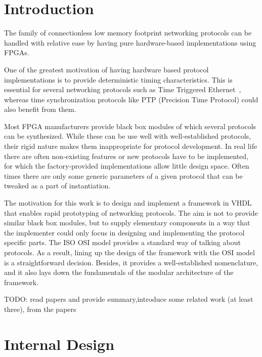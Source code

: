 \documentclass[conference]{IEEEtran}
\begin{document}

\section{Introduction}\label{sec:Motivation}

The family of connectionless low memory footprint networking protocols can be handled with relative ease by having pure
hardware-based implementations using FPGAs.

One of the greatest motivation of having hardware based protocol implementations is to provide deterministic timing
characteristics. This is essential for several networking protocols such as Time Triggered Ethernet~\cite{SAE_AS6802},
whereas time synchronization protocols like PTP (Precision Time Protocol) \cite{PTP_standard}could also benefit from
them.

Most FPGA manufacturers provide black box modules of which several protocols can be synthesized. While these can be use
well with well-established protocols, their rigid nature makes them inappropriate for protocol development. In real
life there are often non-existing features
or new protocols have to be implemented, for which the factory-provided implementations allow little design space.
Often times there are only some generic parameters of a given protocol that can be tweaked as a part of instantiation.

The motivation for this work is to design and implement a framework in VHDL that enables rapid prototyping of
networking protocols. The aim is not to provide similar black box modules, but to supply elementary components in a way
that the implementer could only focus in designing and implementing the protocol specific parts. The ISO OSI model
provides a standard way of talking about protocols. As a result, lining up the design of the framework with the OSI
model is a straightforward decision. Besides, it provides a well-established nomenclature, and it also lays down the
fundamentals of the modular architecture of the framework.


TODO: read papers and provide summary,introduce some related work (at least three), from the papers

\section{Internal Design}\label{sec:Internal Design}
\end{document}
